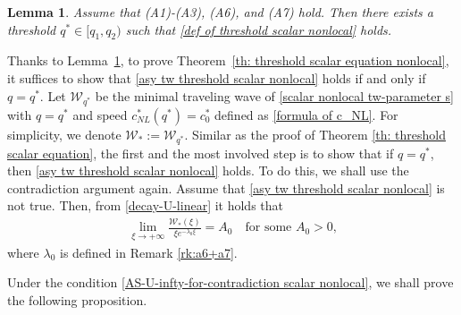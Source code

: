 \documentclass[11pt,a4paper]{article}
\newtheorem{lemma}[theorem]{\textbf{Lemma}}
\numberwithin{equation}{section}
\numberwithin{figure}{section}
\newcommand\bea{\begin{eqnarray}}
\newcommand\eea{\end{eqnarray}}
\begin{document}
\begin{lemma}\label{lem: th1-part1 nonlocal}
Assume that (A1)-(A3), (A6), and (A7) hold. Then there exists a threshold $q^*\in[q_1,q_2)$ such that \eqref{def of threshold scalar nonlocal} holds.
\end{lemma}



Thanks to Lemma~\ref{lem: th1-part1 nonlocal}, to prove Theorem~\ref{th: threshold scalar equation nonlocal}, it suffices to show that
\eqref{asy tw threshold scalar nonlocal} holds if and only if $q=q^*$.
Let $\mathcal{W}_{q^*}$ be the minimal traveling wave of \eqref{scalar nonlocal tw-parameter s} with $q=q^*$
and %
speed $c_{NL}^*(q^*)=c_0^*$ defined as \eqref{formula of c_NL}. For simplicity, we denote $\mathcal{W}_*:=\mathcal{W}_{q^*}$.
Similar as the proof of Theorem \ref{th: threshold scalar equation}, the first and the most involved step is to show that if $q=q^*$, then \eqref{asy tw threshold scalar nonlocal} holds.
To do this, we shall use the contradiction argument again.
Assume that \eqref{asy tw threshold scalar nonlocal} is not true. Then, from \eqref{decay-U-linear}  %
it holds that
\bea\label{AS-U-infty-for-contradiction scalar nonlocal}
\lim_{\xi\rightarrow+\infty}\frac{\mathcal{W}_{*}(\xi)}{\xi e^{-\lambda_0\xi}}=A_0\quad \mbox{for some $A_0>0$,}
\eea
where $\lambda_0$ is defined in Remark \ref{rk:a6+a7}.

Under the condition \eqref{AS-U-infty-for-contradiction scalar nonlocal},
we shall prove the following proposition.
\end{document}
